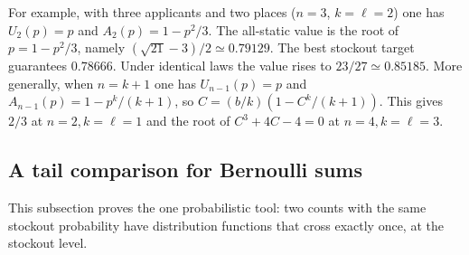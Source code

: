 \documentclass[11pt,a4paper]{article}
\theoremstyle{remark}
\begin{document}
For example, with three applicants and two places ($n=3$, $k=\ell=2$) one has $U_2(p)=p$ and $A_2(p)=1-p^2/3$. The all-static value is the root of $p=1-p^2/3$, namely $(\sqrt{21}-3)/2\simeq0.79129$. The best stockout target guarantees $0.78666$. Under identical laws the value rises to $23/27\simeq0.85185$. More generally, when $n=k+1$ one has $U_{n-1}(p)=p$ and $A_{n-1}(p)=1-p^k/(k+1)$, so $C=(b/k)(1-C^k/(k+1))$. This gives $2/3$ at $n=2,k=\ell=1$ and the root of $C^3+4C-4=0$ at $n=4,k=\ell=3$.

\subsection{A tail comparison for Bernoulli sums}
This subsection proves the one probabilistic tool: two counts with the same stockout probability have distribution functions that cross exactly once, at the stockout level.
\end{document}

